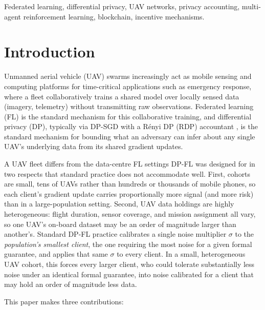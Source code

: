 \documentclass[journal]{IEEEtran}
\begin{document}
\begin{IEEEkeywords}
Federated learning, differential privacy, UAV networks, privacy
accounting, multi-agent reinforcement learning, blockchain, incentive
mechanisms.
\end{IEEEkeywords}

\section{Introduction}

Unmanned aerial vehicle (UAV) swarms increasingly act as mobile sensing
and computing platforms for time-critical applications such as
emergency response, where a fleet collaboratively trains a shared model
over locally sensed data (imagery, telemetry) without transmitting raw
observations. Federated learning (FL) \cite{mcmahan2017} is the
standard mechanism for this collaborative training, and differential
privacy (DP), typically via DP-SGD \cite{abadi2016} with a Rényi DP
(RDP) accountant \cite{mironov2017,wang2019}, is the standard mechanism
for bounding what an adversary can infer about any single UAV's
underlying data from its shared gradient updates.

A UAV fleet differs from the data-centre FL settings DP-FL was designed
for in two respects that standard practice does not accommodate well.
First, cohorts are small, tens of UAVs rather than hundreds or
thousands of mobile phones, so each client's gradient update carries
proportionally more signal (and more risk) than in a large-population
setting. Second, UAV data holdings are highly heterogeneous: flight
duration, sensor coverage, and mission assignment all vary, so one
UAV's on-board dataset may be an order of magnitude larger than
another's. Standard DP-FL practice calibrates a single noise
multiplier $\sigma$ to the \emph{population's smallest client}, the
one requiring the most noise for a given formal guarantee, and applies
that same $\sigma$ to every client. In a small, heterogeneous UAV
cohort, this forces every larger client, who could tolerate
substantially less noise under an identical formal guarantee, into
noise calibrated for a client that may hold an order of magnitude less
data.

This paper makes three contributions:
\end{document}
